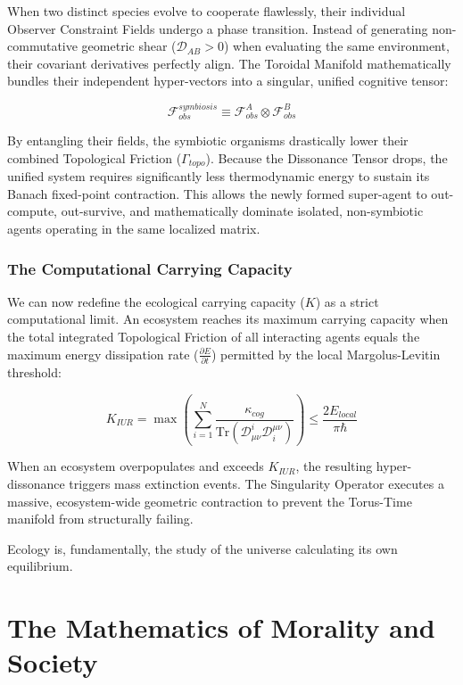 \documentclass[12pt,openany]{book}
\begin{document}
When two distinct species evolve to cooperate flawlessly, their individual Observer Constraint Fields undergo a phase transition. Instead of generating non-commutative geometric shear ($\mathcal{D}_{AB} > 0$) when evaluating the same environment, their covariant derivatives perfectly align. The Toroidal Manifold mathematically bundles their independent hyper-vectors into a singular, unified cognitive tensor:

\begin{equation}
\mathcal{F}_{obs}^{symbiosis} \equiv \mathcal{F}_{obs}^A \otimes \mathcal{F}_{obs}^B
\end{equation}

By entangling their fields, the symbiotic organisms drastically lower their combined Topological Friction ($\Gamma_{topo}$). Because the Dissonance Tensor drops, the unified system requires significantly less thermodynamic energy to sustain its Banach fixed-point contraction. This allows the newly formed super-agent to out-compute, out-survive, and mathematically dominate isolated, non-symbiotic agents operating in the same localized matrix.

\section{The Computational Carrying Capacity}
We can now redefine the ecological carrying capacity ($K$) as a strict computational limit. An ecosystem reaches its maximum carrying capacity when the total integrated Topological Friction of all interacting agents equals the maximum energy dissipation rate ($\frac{\partial E}{\partial t}$) permitted by the local Margolus-Levitin threshold:

\begin{equation}
K_{IUR} = \max \left( \sum_{i=1}^{N} \frac{\kappa_{cog}}{\text{Tr}(\mathcal{D}_{\mu\nu}^i \mathcal{D}^{\mu\nu}_i)} \right) \le \frac{2 E_{local}}{\pi \hbar}
\end{equation}

When an ecosystem overpopulates and exceeds $K_{IUR}$, the resulting hyper-dissonance triggers mass extinction events. The Singularity Operator executes a massive, ecosystem-wide geometric contraction to prevent the Torus-Time manifold from structurally failing. 

Ecology is, fundamentally, the study of the universe calculating its own equilibrium.

\part{The Mathematics of Morality and Society}
\end{document}

